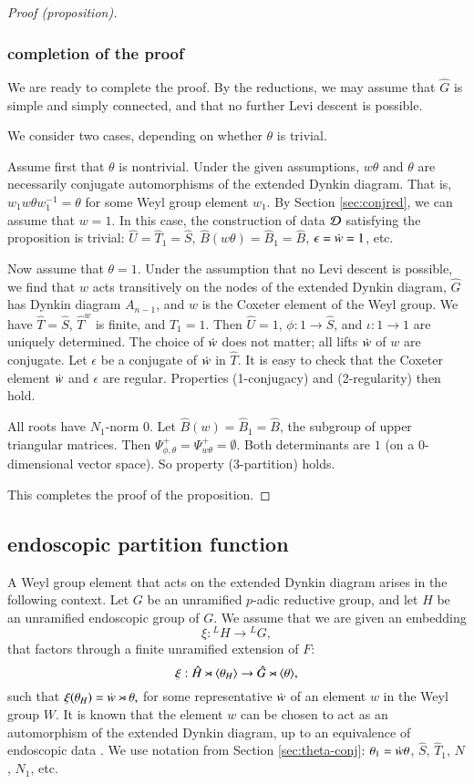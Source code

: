 \begin{proof}[Proof (proposition)]
\subsubsection{completion of the proof}

We are ready to complete the proof.  By the reductions, we may assume
that $\hat G$ is simple and simply connected, and that no further Levi
descent is possible.

We consider two cases, depending on whether $\theta$ is trivial.

Assume first that $\theta$ is nontrivial.  Under the given
assumptions, $w\theta$ and $\theta$ are necessarily conjugate
automorphisms of the extended Dynkin diagram.  That is, $w_1 w \theta
w_1^{-1} = \theta$ for some Weyl group element $w_1$.  By Section
\ref{sec:conjred}, we can assume that $w=1$.  In this case, the
construction of data $\mathcal D$ satisfying the proposition is trivial: $\hat
U = \hat T_1 =\hat S$, $\hat B(w\theta) = \hat B_1 = \hat B$,
$\epsilon = \dot w = 1$, etc.

Now assume that $\theta=1$.  Under the assumption that no Levi descent
is possible, we find that $w$ acts transitively on the nodes of the
extended Dynkin diagram, $\hat G$ has Dynkin diagram $A_{n-1}$, and
$w$ is the Coxeter element of the Weyl group.  We have $\hat T = \hat
S$, $\hat T^w$ is finite, and $\hat T_1 = 1$.  Then $\hat U = 1$,
$\phi:1\to \hat S$, and $\iota:1\to 1$ are uniquely determined.  The
choice of $\dot w$ does not matter; all lifts $\dot w$ of $w$ are
conjugate.  Let $\epsilon$ be a conjugate of $\dot w$ in $\hat T$.  It
is easy to check that the Coxeter element $\dot w$ and $\epsilon$ are
regular.  Properties (1-conjugacy) and (2-regularity) then hold.

All roots have $N_1$-norm $0$.  Let $\hat B(w) = \hat B_1 = \hat B$,
the subgroup of upper triangular matrices.  Then $\Psi_{\phi,\theta}^+
= \Psi_{w\theta}^+=\emptyset$.  Both determinants are $1$ (on a
$0$-dimensional vector space).  So property (3-partition) holds.

This completes the proof of the proposition.
\end{proof}


\subsection{endoscopic partition function}

A Weyl group element that acts on the extended Dynkin diagram arises
in the following context.  Let $G$ be an unramified $p$-adic reductive
group, and let $H$ be an unramified endoscopic group of $G$.  We
assume that we are given an embedding
\[
\xi:{}^LH\to {}^LG,
\]
that factors through a finite unramified extension of $F$:
\[
\xi:\hat H\rtimes \langle{\theta_H}\rangle\to \hat G\rtimes \langle{\theta}\rangle,
\]
such that $\xi(\theta_H) = \dot w \rtimes \theta,$ for some
representative $\dot w $ of an element $w$ in the Weyl group $W$.  It
is known that the element $w$ can be chosen to act as an automorphism
of the extended Dynkin diagram, up to an equivalence of endoscopic
data \cite[\S4.7]{hales1993simple}.  We use notation from Section
\ref{sec:theta-conj}: $\theta_1 = \dot w\theta$, $\hat S$, $\hat T_1$,
$N$, $N_1$, etc.


